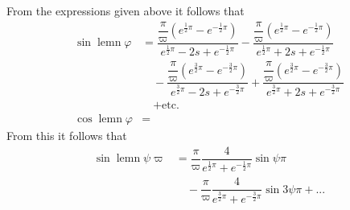 From the expressions given above it follows that
\[
\begin{aligned}
\sin\operatorname{lemn}\varphi
&=\dfrac{\dfrac{\pi}{\varpi}(e^{\frac12\pi}-e^{-\frac12\pi})}
        {e^{\frac12\pi}-2s+e^{-\frac12\pi}}
 -\dfrac{\dfrac{\pi}{\varpi}(e^{\frac12\pi}-e^{-\frac12\pi})}
        {e^{\frac12\pi}+2s+e^{-\frac12\pi}}\\[5pt]
&\quad-\dfrac{\dfrac{\pi}{\varpi}(e^{\frac32\pi}-e^{-\frac32\pi})}
        {e^{\frac32\pi}-2s+e^{-\frac32\pi}}
 +\dfrac{\dfrac{\pi}{\varpi}(e^{\frac32\pi}-e^{-\frac32\pi})}
        {e^{\frac32\pi}+2s+e^{-\frac32\pi}}\\[5pt]
&\quad+\text{etc.}\\[5pt]
\cos\operatorname{lemn}\varphi&= 
\end{aligned}
\]
From this it follows that
\[
\begin{aligned}\sin\operatorname{lemn}\psi\varpi
&=\dfrac{\pi}{\varpi}\dfrac{4}{e^{\frac12\pi}+e^{-\frac12\pi}}\sin\psi\pi
\\[7pt]&\quad{}-\dfrac{\pi}{\varpi}\dfrac{4}{e^{\frac32\pi}+e^{-\frac32\pi}}\sin3\psi\pi
+\mathord{.}\mathord{.}\mathord{.}\end{aligned}
\]
\clearpage
\endgroup

